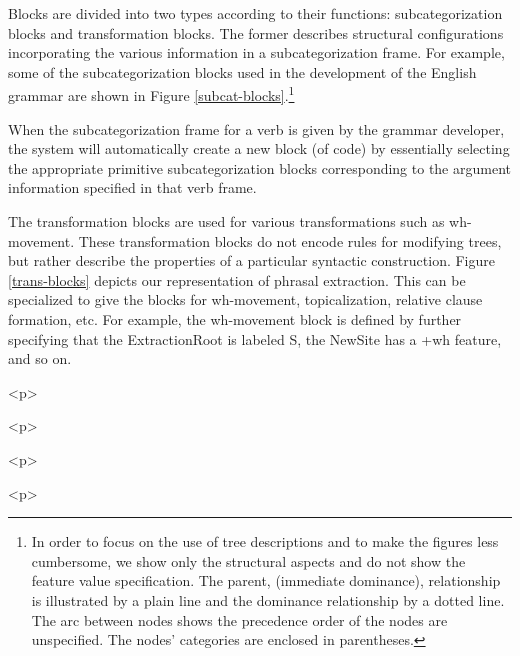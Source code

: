 Blocks are divided into two types according to their functions: 
subcategorization  blocks 
and transformation blocks. 
The former describes structural configurations incorporating 
the various information in a subcategorization frame. 
For example, some of the subcategorization blocks 
used in the 
development of the English grammar are shown in Figure 
\ref{subcat-blocks}.\footnote{ In order to focus on the use of tree descriptions and to make the figures less cumbersome, we show only the structural aspects and do not show the feature value specification. The parent, (immediate dominance), relationship is illustrated by a plain line and the dominance relationship by a dotted line. The arc between nodes shows the precedence order of the nodes are unspecified. The nodes' categories are enclosed in parentheses.} 
 
When the subcategorization frame for a  verb is given 
 by the grammar 
developer, the system will automatically create a new block (of code) by 
essentially selecting the appropriate primitive subcategorization blocks 
corresponding to the argument information specified in that verb 
frame. 
 
The transformation blocks are used for various transformations such as 
wh-movement. These transformation blocks do not encode 
rules for modifying trees, but rather describe 
 the properties of a particular syntactic construction. 
 Figure \ref{trans-blocks} depicts 
our representation of phrasal extraction. 
This can be specialized to give the 
blocks for wh-movement, topicalization, relative clause formation, etc.  
For example, the 
wh-movement block is defined by further specifying that the ExtractionRoot is 
labeled S, the NewSite 
has a +wh feature, and so on. 
 
 
\begin{rawhtml} <p> \end{rawhtml}
\centerline{} 
\begin{rawhtml} <dl> <dt>{Some subcategorization blocks <p> </dl> \end{rawhtml}
\label{subcat-blocks} 
\begin{rawhtml} <p> \end{rawhtml}
 
\begin{rawhtml} <p> \end{rawhtml}
\centerline{} 
\begin{rawhtml} <dl> <dt>{Transformation blocks for extraction <p> </dl> \end{rawhtml}
\label{trans-blocks} 
\begin{rawhtml} <p> \end{rawhtml}
 
